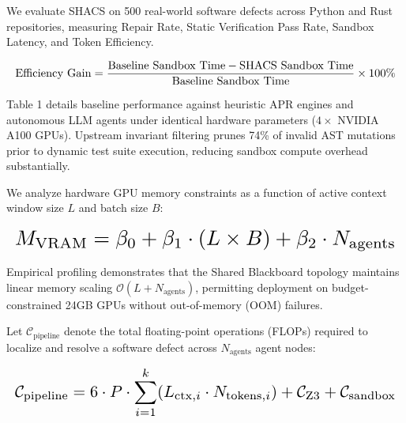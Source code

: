 \documentclass[10pt,twocolumn,letterpaper]{article}
\begin{document}
We evaluate SHACS on 500 real-world software defects across Python and Rust repositories, measuring Repair Rate, Static Verification Pass Rate, Sandbox Latency, and Token Efficiency.


\begin{equation}
\resizebox{\columnwidth}{!}{$\displaystyle
\begin{aligned}
\text{Efficiency Gain} = \frac{\text{Baseline Sandbox Time} - \text{SHACS Sandbox Time}}{\text{Baseline Sandbox Time}} \times 100\%
\end{aligned}
$}
\end{equation}





Table 1 details baseline performance against heuristic APR engines and autonomous LLM agents under identical hardware parameters ($4\times$ NVIDIA A100 GPUs). Upstream invariant filtering prunes 74\% of invalid AST mutations prior to dynamic test suite execution, reducing sandbox compute overhead substantially.




We analyze hardware GPU memory constraints as a function of active context window size $L$ and batch size $B$:

\begin{equation}
\resizebox{\columnwidth}{!}{$\displaystyle
\begin{aligned}
M_{\text{VRAM}} = \beta_0 + \beta_1 \cdot (L \times B) + \beta_2 \cdot N_{\text{agents}}
\end{aligned}
$}
\end{equation}


Empirical profiling demonstrates that the Shared Blackboard topology maintains linear memory scaling $\mathcal{O}(L + N_{\text{agents}})$, permitting deployment on budget-constrained 24GB GPUs without out-of-memory (OOM) failures.

Let $\mathcal{C}_{\text{pipeline}}$ denote the total floating-point operations (FLOPs) required to localize and resolve a software defect across $N_{\text{agents}}$ agent nodes:

\begin{equation}
\resizebox{\columnwidth}{!}{$\displaystyle
\begin{aligned}
\mathcal{C}_{\text{pipeline}} = 6 \cdot P \cdot \sum_{i=1}^k (L_{\text{ctx},i} \cdot N_{\text{tokens},i}) + \mathcal{C}_{\text{Z3}} + \mathcal{C}_{\text{sandbox}}
\end{aligned}
$}
\end{equation}
\end{document}
